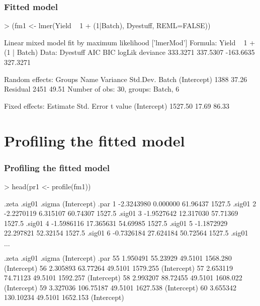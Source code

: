 \documentclass[dvipsnames,pdflatex,beamer]{beamer}
\begin{document}
\begin{frame}[fragile]
  \frametitle{Fitted model}
\begin{Schunk}
\begin{Sinput}
> (fm1 <- lmer(Yield ~ 1 + (1|Batch), Dyestuff, REML=FALSE))
\end{Sinput}
\begin{Soutput}
Linear mixed model fit by maximum likelihood ['lmerMod']
Formula: Yield ~ 1 + (1 | Batch) 
   Data: Dyestuff 
      AIC       BIC    logLik  deviance 
 333.3271  337.5307 -163.6635  327.3271 

Random effects:
 Groups   Name        Variance Std.Dev.
 Batch    (Intercept) 1388     37.26   
 Residual             2451     49.51   
Number of obs: 30, groups: Batch, 6

Fixed effects:
            Estimate Std. Error t value
(Intercept)  1527.50      17.69   86.33
\end{Soutput}
\end{Schunk}
\end{frame}

\section{Profiling the fitted model}


\begin{frame}[fragile]
  \frametitle{Profiling the fitted model}
\begin{Schunk}
\begin{Sinput}
> head(pr1 <- profile(fm1))
\end{Sinput}
\end{Schunk}
\begin{Schunk}
\begin{Soutput}
       .zeta    .sig01   .sigma (Intercept)   .par
1 -2.3243980  0.000000 61.96437      1527.5 .sig01
2 -2.2270119  6.315107 60.74307      1527.5 .sig01
3 -1.9527642 12.317030 57.71369      1527.5 .sig01
4 -1.5986116 17.365631 54.69985      1527.5 .sig01
5 -1.1872929 22.297821 52.32154      1527.5 .sig01
6 -0.7326184 27.624184 50.72564      1527.5 .sig01
\end{Soutput}
\end{Schunk}
$\dots$
\begin{Schunk}
\begin{Soutput}
      .zeta    .sig01  .sigma (Intercept)        .par
55 1.950491  55.23929 49.5101    1568.280 (Intercept)
56 2.305893  63.77264 49.5101    1579.255 (Intercept)
57 2.653119  74.71123 49.5101    1592.257 (Intercept)
58 2.993207  88.72455 49.5101    1608.022 (Intercept)
59 3.327036 106.75187 49.5101    1627.538 (Intercept)
60 3.655342 130.10234 49.5101    1652.153 (Intercept)
\end{Soutput}
\end{Schunk}
\end{frame}
\end{document}
